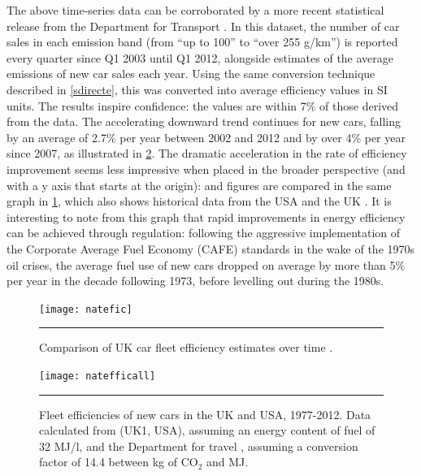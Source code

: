 The above time-series data can be corroborated by a more recent statistical
release from the Department for Transport \citep[table VEH0256]{Df2013licencing}.
In this dataset, the number of car sales in each emission band (from
``up to 100'' to ``over 255 g/km'') is reported every quarter since Q1 2003
until Q1 2012, alongside estimates of the average emissions of new car sales
each year. Using the same conversion technique described in \cref{sdirecte},
this was converted into average efficiency values in SI units. The results
inspire confidence: the values are within 7\% of those derived from
the \citet{Decc2011t} data. The accelerating downward trend continues for new cars,
falling by an average of 2.7\% per year between 2002 and 2012 and by over
4\% per year since 2007, as illustrated in \cref{fnatefic}.
The dramatic acceleration in the rate of efficiency improvement
seems less impressive when placed in the broader perspective (and with a
y axis that starts at the origin):
\citet{Df2013licencing} and \citet{Decc2011t} figures are compared in
the same graph in \cref{fnatefficall}, which also shows historical data from the USA
and the UK \citep{Schipper1993}. It is interesting to note from this graph
that rapid improvements in energy efficiency can be achieved through regulation:
following the aggressive implementation of the
Corporate Average Fuel Economy (CAFE) standards in the wake of the 1970s oil
crises, the average fuel use of new cars dropped on average by more than 5\%
per year in the decade following 1973, before levelling out during the
1980s.


\begin{figure}[h]
  \centerline{
    \texttt{[image: natefic]}}
    \rule{35em}{0.5pt}
  \caption{Comparison of UK car fleet efficiency estimates over time \citep{Df2013licencing}.}
  \label{fnatefficall}
\end{figure}


\begin{figure}[h]
  \centerline{
    \texttt{[image: natefficall]}}
    \rule{35em}{0.5pt}
  \caption[Fleet efficiencies of new cars in the UK and USA, 1977-2012]
  {Fleet efficiencies of new cars in the UK and USA, 1977-2012.
  Data calculated from 
  \citet{Schipper1993} (UK1, USA), assuming an energy content of fuel of
  32 MJ/l, and the Department for travel
  \citep[table VEH0256]{Df2013licencing}, assuming a conversion factor
  of 14.4 between kg of CO$_2$ and MJ.}
  \label{fnatefic}
\end{figure}

